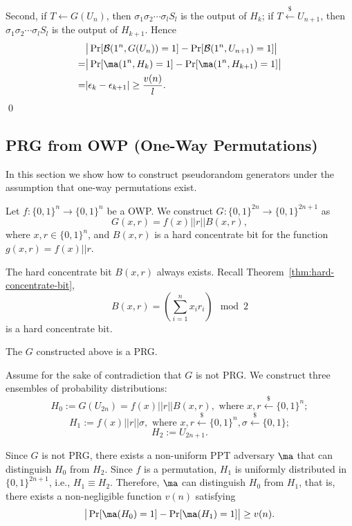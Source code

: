 Second, if $T\gets G(U_n)$, then $\sigma_1 \sigma_2 \cdots \sigma_l S_l$ is the output of  $H_{k}$; if $T \stackrel{\$}\leftarrow U_{n+1}$, then $\sigma_1 \sigma_2 \cdots \sigma_l S_l$ is the output of $H_{k+1}$.
Hence
\begin{align*}
&\big|\Pr[\mathcal{B}(1^n, G(U_n)) = 1] - \Pr[\mathcal{B}(1^n, U_{n+1}) = 1]\big|\\
=& \big|\Pr[\ma(1^n,H_k) = 1] - \Pr[\ma(1^n,H_{k+1}) = 1]\big|\\
=&
|\epsilon_{k} - \epsilon_{k+1}| \geq \frac{v(n)}{l}.
\end{align*}
\qed

\subsection{PRG from OWP (One-Way Permutations)}
In this section we show how to construct pseudorandom generators under the assumption that one-way permutations exist.

\begin{construction}
Let $f: \{0, 1\}^n \rightarrow \{0, 1\}^n$ be a OWP. We construct $G: \{0, 1\}^{2n} \rightarrow \{0, 1\}^{2n+1}$ as
\[
G(x, r) = f(x) || r || B(x, r),
\]
where $x, r \in \{0, 1\}^n$, and $B(x, r)$ is a hard concentrate bit for the function $g(x,r) = f(x) || r$.
\end{construction}

\begin{remark}
The hard concentrate bit $B(x,r)$ always exists. Recall Theorem~\ref{thm:hard-concentrate-bit},
\[B(x,r) = \left(\sum_{i=1}^n x_i r_i\right)\mod 2\]
is a hard concentrate bit.
\end{remark}

\begin{theorem}
The $G$ constructed above is a PRG.
\end{theorem}

\proof
Assume for the sake of contradiction that $G$ is not PRG.
We construct three ensembles of probability distributions:
\[H_0 := G(U_{2n}) = f(x) || r || B(x, r), \text{ where } x, r \xleftarrow{\$} \{0, 1\}^n;\]
\[H_1 := f(x) || r || \sigma, \text{ where } x, r \xleftarrow{\$} \{0, 1\}^n, \sigma \xleftarrow{\$} \{0, 1\};\]
\[H_2 := U_{2n+1}.\]

Since $G$ is not PRG, there exists a non-uniform PPT adversary $\ma$ that can distinguish $H_0$ from $H_2$.
Since $f$ is a permutation, $H_1$ is uniformly distributed in $\{0, 1\}^{2n+1}$, i.e., $H_1 \equiv H_2$.
Therefore, $\ma$ can distinguish $H_0$ from $H_1$,
that is, there exists a non-negligible function $v(n)$ satisfying
\[
\big| \Pr[\ma(H_0)=1] - \Pr[\ma(H_1)=1] \big| \geq v(n).
\]

